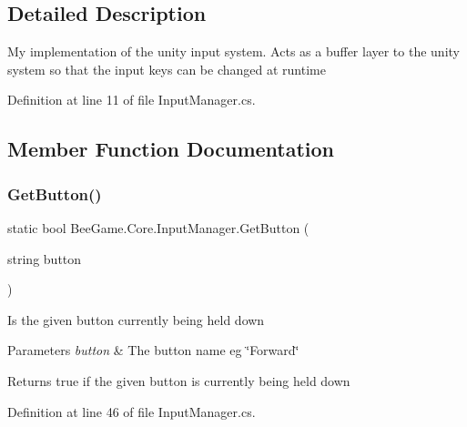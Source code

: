 \subsection{Detailed Description}
My implementation of the unity input system. Acts as a buffer layer to the unity system so that the input keys can be changed at runtime 



Definition at line 11 of file Input\+Manager.\+cs.



\subsection{Member Function Documentation}
\mbox{\label{class_bee_game_1_1_core_1_1_input_manager_a2bd5bb8dc1aaf482f50b9751037eb64c}} 
\subsubsection{\texorpdfstring{Get\+Button()}{GetButton()}}
{\footnotesize\ttfamily static bool Bee\+Game.\+Core.\+Input\+Manager.\+Get\+Button (\begin{DoxyParamCaption}\item[{string}]{button }\end{DoxyParamCaption})\hspace{0.3cm}{\ttfamily [static]}}



Is the given button currently being held down 


\begin{DoxyParams}{Parameters}
{\em button} & The button name eg \char`\"{}\+Forward\char`\"{}\\
\hline
\end{DoxyParams}
\begin{DoxyReturn}{Returns}
true if the given button is currently being held down
\end{DoxyReturn}


Definition at line 46 of file Input\+Manager.\+cs.


